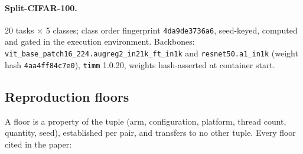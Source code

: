 \paragraph{Split-CIFAR-100.} 20 tasks $\times$ 5 classes; class order
fingerprint \texttt{4da9de3736a6}, seed-keyed, computed and gated in the
execution environment. Backbones: \texttt{vit\_base\_patch16\_224.augreg2\_in21k\_ft\_in1k}
and \texttt{resnet50.a1\_in1k} (weight hash \texttt{4aa4ff84c7e0}),
\texttt{timm} 1.0.20, weights hash-asserted at container start.

\subsection{Reproduction floors}

A floor is a property of the tuple (arm, configuration, platform, thread count,
quantity, seed), established per pair, and transfers to no other tuple. Every
floor cited in the paper:

